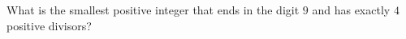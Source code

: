 What is the smallest positive integer that ends in the digit $9$ and has exactly $4$ positive divisors?
